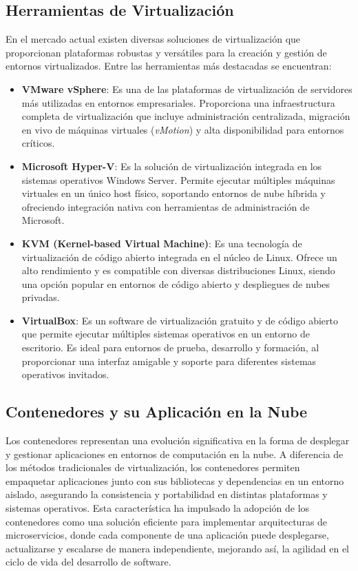 {        \subsection{Herramientas de Virtualización}
            En el mercado actual existen diversas soluciones de virtualización que proporcionan plataformas robustas y versátiles para la creación y gestión de entornos virtualizados. Entre las herramientas más destacadas se encuentran:
            
            \begin{itemize}
                \item \textbf{VMware vSphere}: Es una de las plataformas de virtualización de servidores más utilizadas en entornos empresariales. Proporciona una infraestructura completa de virtualización que incluye administración centralizada, migración en vivo de máquinas virtuales (\textit{vMotion}) y alta disponibilidad para entornos críticos.
                \item \textbf{Microsoft Hyper-V}: Es la solución de virtualización integrada en los sistemas operativos Windows Server. Permite ejecutar múltiples máquinas virtuales en un único host físico, soportando entornos de nube híbrida y ofreciendo integración nativa con herramientas de administración de Microsoft.
                \item \textbf{KVM (Kernel-based Virtual Machine)}: Es una tecnología de virtualización de código abierto integrada en el núcleo de Linux. Ofrece un alto rendimiento y es compatible con diversas distribuciones Linux, siendo una opción popular en entornos de código abierto y despliegues de nubes privadas.
                \item \textbf{VirtualBox}: Es un software de virtualización gratuito y de código abierto que permite ejecutar múltiples sistemas operativos en un entorno de escritorio. Es ideal para entornos de prueba, desarrollo y formación, al proporcionar una interfaz amigable y soporte para diferentes sistemas operativos invitados.
            \end{itemize}
        
        \subsection{Contenedores y su Aplicación en la Nube}
            Los contenedores representan una evolución significativa en la forma de desplegar y gestionar aplicaciones en entornos de computación en la nube. A diferencia de los métodos tradicionales de virtualización, los contenedores permiten empaquetar aplicaciones junto con sus bibliotecas y dependencias en un entorno aislado, asegurando la consistencia y portabilidad en distintas plataformas y sistemas operativos. Esta característica ha impulsado la adopción de los contenedores como una solución eficiente para implementar arquitecturas de microservicios, donde cada componente de una aplicación puede desplegarse, actualizarse y escalarse de manera independiente, mejorando así, la agilidad en el ciclo de vida del desarrollo de software.

}
